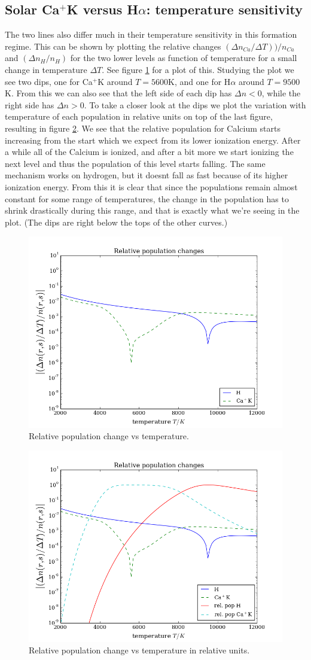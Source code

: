 \documentclass{aa}   %
\begin{document}
\subsection{Solar Ca$^+$K versus H$\alpha$: temperature sensitivity}
The two lines also differ much in their temperature sensitivity in this formation regime. This can be shown by plotting the relative changes $(\Delta n_{Ca}/\Delta T))/n_{Ca}$ and $(\Delta n_H/n_H)$ for the two lower levels as function of temperature for a small change in temperature $\Delta T$. See figure \ref{relpopchange} for a plot of this. Studying the plot we see two dips, one for Ca$^+$K around $T = 5600$K, and one for H$\alpha$ around $T = 9500$K. From this we can also see that the left side of each dip has $\Delta n < 0$, while the right side has $\Delta n > 0$. To take a closer look at the dips we plot the variation with temperature of each population in relative units on top of the last figure, resulting in figure \ref{relpopchange2}. We see that the relative population for Calcium starts increasing from the start which we expect from its lower ionization energy. After a while all of the Calcium is ionized, and after a bit more we start ionizing the next level and thus the population of this level starts falling. The same mechanism works on hydrogen, but it doesnt fall as fast because of its higher ionization energy. From this it is clear that since the populations remain almost constant for some range of temperatures, the change in the population has to shrink drastically during this range, and that is exactly what we're seeing in the plot. (The dips are right below the tops of the other curves.)
\begin{figure}
 \includegraphics[width=.49\textwidth]{relpopchange.png}
 \caption{Relative population change vs temperature.}
 \label{relpopchange}
\end{figure}
\begin{figure}
 \includegraphics[width=.49\textwidth]{relpopchange2.png}
 \caption{Relative population change vs temperature in relative units.}
 \label{relpopchange2}
\end{figure}
\end{document}
